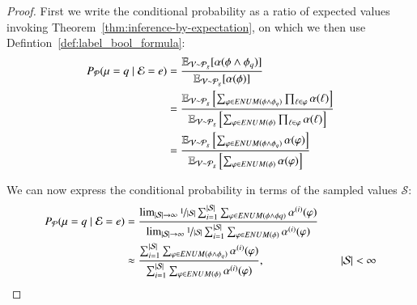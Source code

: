 \begin{proof}
    First we write the conditional probability as a ratio of expected values invoking Theorem~\ref{thm:inference-by-expectation}, on which we then use Defintion~\ref{def:label_bool_formula}:
    \begin{align}
        P_\mathcal{P}(\mu=q\mid\mathcal{E} = e)
         & = \frac{\operatorname*{\mathbb{E}}_{\mathcal{V} \sim  \mathcal{P}_g} [\alpha( \phi \wedge \phi_q)] }{\operatorname*{\mathbb{E}}_{\mathcal{V} \sim  \mathcal{P}_g} [\alpha( \phi )] }
        \\
         & =
        \frac{
            \operatorname*{\mathbb{E}}_{\mathcal{V} \sim  \mathcal{P}_g} \left[ \sum_{\varphi\in ENUM(\phi \land \phi_{q}) } \prod_{\ell \in \varphi} \alpha(\ell) \right]
        }
        {
            \operatorname*{\mathbb{E}}_{\mathcal{V} \sim  \mathcal{P}_g} \left[ \sum_{\varphi\in ENUM(\phi) } \prod_{\ell \in \varphi} \alpha(\ell)  \right]
        }
        \\
         & =
        \frac{
            \operatorname*{\mathbb{E}}_{\mathcal{V} \sim  \mathcal{P}_g} \left[ \sum_{\varphi\in ENUM(\phi \land \phi_{q}) } \alpha(\varphi) \right]
        }
        {
            \operatorname*{\mathbb{E}}_{\mathcal{V} \sim  \mathcal{P}_g} \left[ \sum_{\varphi\in ENUM(\phi) } \alpha(\varphi)  \right]
        }
    \end{align}



    We can now express the conditional probability in terms of the sampled values $\mathcal{S}$:
    \begin{align}
        P_\mathcal{P}(\mu=q\mid\mathcal{E}=e)
           & =
        \frac{
        \lim_{ \lvert \mathcal{S} \rvert \rightarrow \infty} \nicefrac{1}{\lvert \mathcal{S} \rvert} \sum_{i=1}^{\lvert \mathcal{S} \rvert}  \sum_{\varphi\in ENUM(\phi \land \phi{q}) } \alpha^{(i)}(\varphi)
        }
        {
        \lim_{\lvert \mathcal{S} \rvert \rightarrow \infty} \nicefrac{1}{\lvert \mathcal{S} \rvert} \sum_{i=1}^{\lvert \mathcal{S} \rvert} \sum_{\varphi\in ENUM(\phi) } \alpha^{(i)}(\varphi)
        }                                                                   \\
           & \approx
        \frac{
        \sum_{i=1}^{\lvert \mathcal{S} \rvert}  \sum_{\varphi\in ENUM(\phi \land \phi_{q}) } \alpha^{(i)}(\varphi)
        }
        {
        \sum_{i=1}^{\lvert \mathcal{S} \rvert} \sum_{\varphi\in ENUM(\phi) } \alpha^{(i)}(\varphi)
        }, & \quad \lvert \mathcal{S} \rvert<\infty \label{eq:mc_prob_cond}
    \end{align}
\end{proof}


